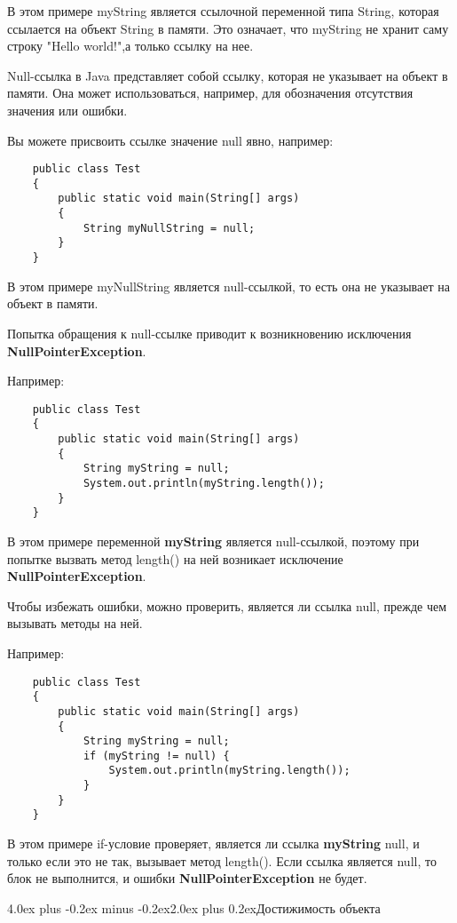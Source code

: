 \documentclass[12pt, a4paper]{book}%
\makeatletter
\renewcommand{\section}{\@startsection{section}{1}{1pt}%
{4.0ex plus -0.2ex minus -0.2ex}{2.0ex plus 0.2ex}{\centering\bf}}%
\makeatother
\begin{document}
{В этом примере myString является ссылочной переменной типа String, которая ссылается на объект String в памяти. Это означает, что myString не хранит саму строку "Hello world!",а только ссылку на нее.

Null-ссылка в Java представляет собой ссылку, которая не указывает на объект в памяти. Она может использоваться, например, для обозначения отсутствия значения или ошибки. 

Вы можете присвоить ссылке значение null явно, например:

\begin{lstlisting}
    public class Test
    {
        public static void main(String[] args)
        {
            String myNullString = null;
        }
    }
\end{lstlisting}

В этом примере myNullString является null-ссылкой, то есть она не указывает на объект в памяти.

Попытка обращения к null-ссылке приводит к возникновению исключения {\bf NullPointerException}.

Например:

\begin{lstlisting}
    public class Test
    {
        public static void main(String[] args)
        {
            String myString = null;
            System.out.println(myString.length());
        }
    }
\end{lstlisting}

В этом примере переменной {\bf myString} является null-ссылкой, поэтому при попытке вызвать метод length() на ней возникает исключение {\bf NullPointerException}.

Чтобы избежать ошибки, можно проверить, является ли ссылка null, прежде чем вызывать методы на ней. 

Например:

\begin{lstlisting}
    public class Test
    {
        public static void main(String[] args)
        {
            String myString = null;
            if (myString != null) {
                System.out.println(myString.length());
            }
        }
    }
\end{lstlisting}

В этом примере if-условие проверяет, является ли ссылка {\bf myString} null, и только если это не так, вызывает метод length(). Если ссылка является null, то блок не выполнится, и ошибки {\bf NullPointerException} не будет.

\section{Достижимость объекта}

}
\end{document}
